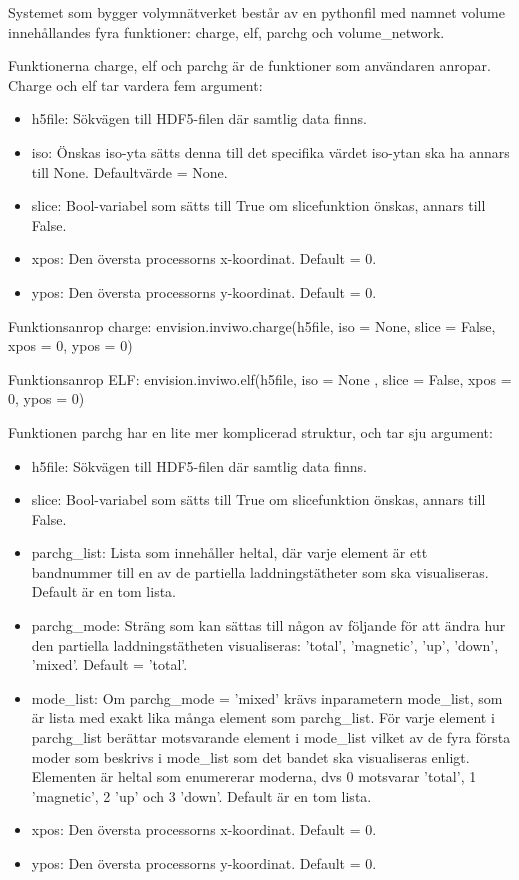 \documentclass[a4paper,12pt]{article}
\begin{document}
Systemet som bygger volymnätverket består av en pythonfil med namnet volume
innehållandes fyra funktioner: charge, elf, parchg och volume\_network.

Funktionerna charge, elf och parchg är de funktioner som användaren anropar. Charge och elf tar vardera fem argument:

\begin{itemize}
\item h5file: Sökvägen till HDF5-filen där samtlig data finns.
\item iso: Önskas iso-yta
sätts denna till det specifika värdet iso-ytan ska ha annars till None. Defaultvärde = None.
\item slice: Bool-variabel som sätts till True om slicefunktion önskas, annars till False.
\item xpos: Den översta processorns x-koordinat. Default = 0.
\item ypos: Den översta processorns y-koordinat. Default = 0.
\end{itemize}

Funktionsanrop charge: \newline
envision.inviwo.charge(h5file, iso = None,
slice = False, xpos = 0, ypos = 0)

Funktionsanrop ELF: \newline
envision.inviwo.elf(h5file, iso = None
, slice = False, xpos = 0, ypos = 0) \newline

Funktionen parchg har en lite mer komplicerad struktur, och tar sju argument:

\begin{itemize}
\item h5file: Sökvägen till HDF5-filen där samtlig data finns.
\item slice: Bool-variabel som sätts till True om slicefunktion önskas, annars till False.
\item parchg\_list: Lista som innehåller heltal, där varje element är ett bandnummer till en av de partiella laddningstätheter som ska visualiseras. Default är en tom lista.
\item parchg\_mode: Sträng som kan sättas till någon av följande för att ändra hur den partiella laddningstätheten visualiseras: 'total', 'magnetic', 'up', 'down', 'mixed'. Default = 'total'.
\item mode\_list: Om parchg\_mode = 'mixed' krävs inparametern mode\_list, som är lista med exakt lika många element som parchg\_list. För varje element i parchg\_list berättar motsvarande element i mode\_list vilket av de fyra första moder som beskrivs i mode\_list som det bandet ska visualiseras enligt. Elementen är heltal som enumererar moderna, dvs 0 motsvarar 'total', 1 'magnetic', 2 'up' och 3 'down'. Default är en tom lista.
\item xpos: Den översta processorns x-koordinat. Default = 0.
\item ypos: Den översta processorns y-koordinat. Default = 0.
\end{itemize}
\end{document}
